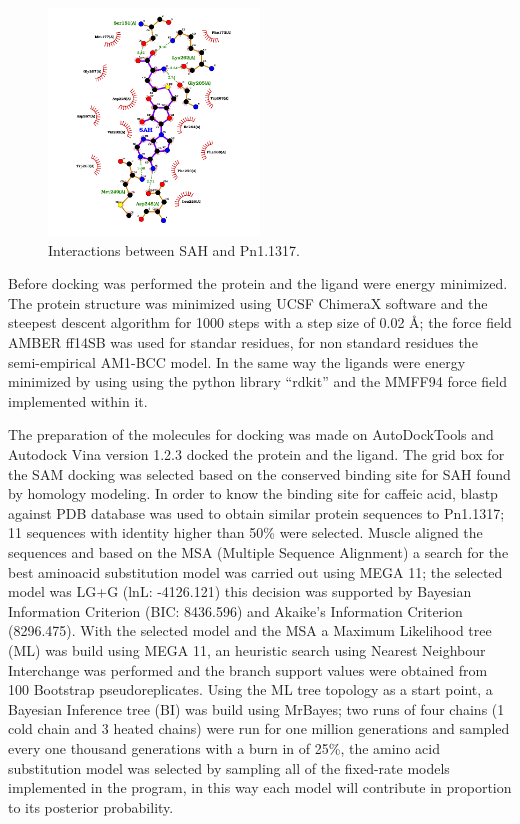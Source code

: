 \documentclass[12pt]{article}
\begin{document}
	\FloatBarrier
	\begin{figure}
		\centering
		\includegraphics[width=0.5\textwidth]{../4/Swiss/sah.png}
		\caption{\centering Interactions between SAH and Pn1.1317.}
		\label{fig4_3}
	\end{figure}
	\FloatBarrier
	
	Before docking was performed the protein and the ligand were energy minimized. The protein structure was minimized using UCSF ChimeraX software \cite{chimera,chimera_2} and the steepest descent algorithm for 1000 steps with a step size of 0.02 \r{A}; the force field AMBER ff14SB was used for standar residues, for non standard residues the semi-empirical AM1-BCC model. \cite{am1_bcc,am1_bcc_2,am1_bcc_3} In the same way the ligands were energy minimized by using using the python library ``rdkit'' and the MMFF94 force field implemented within it. \cite{rdkit,rdkit_mmff}
	
	The preparation of the molecules for docking was made on AutoDockTools and Autodock Vina version 1.2.3 docked the protein and the ligand. \cite{adt,vina,vina_2} The grid box for the SAM docking was selected based on the conserved binding site for SAH found by homology modeling. In order to know the binding site for caffeic acid, blastp against PDB database was used to obtain similar protein sequences to Pn1.1317; 11 sequences with identity higher than 50\% were selected. \cite{blastp,blastp_2} Muscle aligned the sequences and based on the MSA (Multiple Sequence Alignment) a search for the best aminoacid substitution model was carried out using MEGA 11; the selected model was LG+G (lnL: -4126.121) this decision was supported by Bayesian Information Criterion (BIC: 8436.596) and Akaike's Information Criterion (8296.475). \cite{muscle,mega11} With the selected model and the MSA a Maximum Likelihood tree (ML) was build using MEGA 11, an heuristic search using Nearest Neighbour Interchange was performed and the branch support values were obtained from 100 Bootstrap pseudoreplicates. \cite{mega11} Using the ML tree topology as a start point, a Bayesian Inference tree (BI) was build using MrBayes; two runs of four chains (1 cold chain and 3 heated chains) were run for one million generations and sampled every one thousand generations with a burn in of 25\%, the amino acid substitution model was selected by sampling all of the fixed-rate models implemented in the program, in this way each model will contribute in proportion to its posterior probability. \cite{mrbayes}
	
\end{document}
